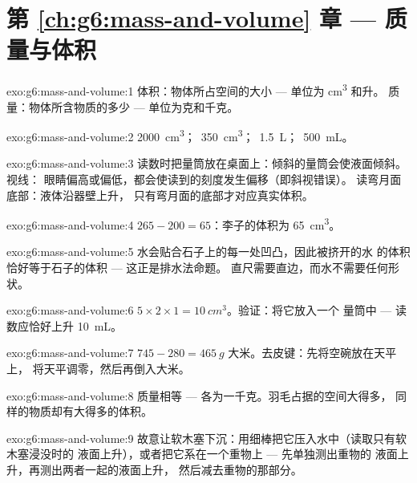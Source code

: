 \section*{第 \ref{ch:g6:mass-and-volume} 章 --- 质量与体积}

\begin{solution}{exo:g6:mass-and-volume:1}
体积：物体所占空间的大小 --- 单位为 \unit{cm^3} 和升。
质量：物体所含物质的多少 --- 单位为克和千克。
\end{solution}

\begin{solution}{exo:g6:mass-and-volume:2}
\qty{2000}{cm^3}；\ \qty{350}{cm^3}；\ \qty{1.5}{L}；\
\qty{500}{mL}。
\end{solution}

\begin{solution}{exo:g6:mass-and-volume:3}
读数时把量筒放在桌面上：倾斜的量筒会使液面倾斜。视线：
眼睛偏高或偏低，都会使读到的刻度发生偏移（即斜视错误）。
读弯月面底部：液体沿器壁上升，
只有弯月面的底部才对应真实体积。
\end{solution}

\begin{solution}{exo:g6:mass-and-volume:4}
$265 - 200 = 65$：李子的体积为 \qty{65}{cm^3}。
\end{solution}

\begin{solution}{exo:g6:mass-and-volume:5}
水会贴合石子上的每一处凹凸，因此被挤开的水
的体积恰好等于石子的体积 --- 这正是排水法命题。
直尺需要直边，而水不需要任何形状。
\end{solution}

\begin{solution}{exo:g6:mass-and-volume:6}
$5 \times 2 \times 1 = \qty{10}{cm^3}$。验证：将它放入一个
量筒中 --- 读数应恰好上升 \qty{10}{mL}。
\end{solution}

\begin{solution}{exo:g6:mass-and-volume:7}
$745 - 280 = \qty{465}{g}$ 大米。去皮键：先将空碗放在天平上，
将天平调零，然后再倒入大米。
\end{solution}

\begin{solution}{exo:g6:mass-and-volume:8}
质量相等 --- 各为一千克。羽毛占据的空间大得多，
同样的物质却有大得多的体积。
\end{solution}

\begin{solution}{exo:g6:mass-and-volume:9}
故意让软木塞下沉：用细棒把它压入水中（读取只有软木塞浸没时的
液面上升），或者把它系在一个重物上 --- 先单独测出重物的
液面上升，再测出两者一起的液面上升，
然后减去重物的那部分。
\end{solution}

